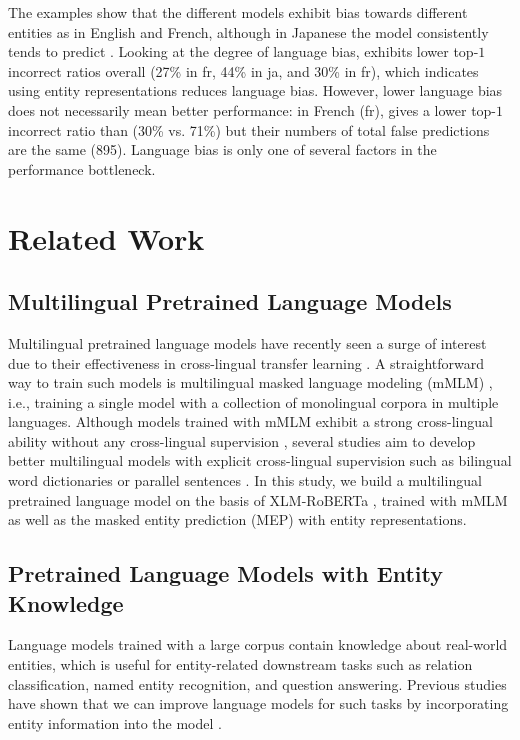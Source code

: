 \documentclass[11pt]{article}
\begin{document}
The examples show that the different models exhibit bias towards different entities as in English and French, although in Japanese the model consistently tends to predict .
Looking at the degree of language bias, \mlukeEwithXY{} exhibits lower top-$1$ incorrect ratios overall (27\% in fr, 44\% in ja, and 30\% in fr), which indicates using entity representations reduces language bias.
However, lower language bias does not necessarily mean better performance: in French (fr), \mlukeEwithXY{} gives
a lower top-$1$ incorrect ratio than \mbert{} (30\% vs. 71\%) but their numbers of total false predictions are the same (895).
Language bias is only one of several factors in the performance bottleneck.
  \section{Related Work}

\subsection{Multilingual Pretrained Language Models}
Multilingual pretrained language models have recently seen a surge of interest due to their effectiveness in cross-lingual transfer learning \citep{NEURIPS2019_c04c19c2,liu-etal-2020-multilingual}.
A straightforward way to train such models is multilingual masked language modeling (mMLM) \citep{devlin2018bert,conneau-etal-2020-unsupervised}, i.e., training a single model with a collection of monolingual corpora in multiple languages.
Although models trained with mMLM exhibit a strong cross-lingual ability without any cross-lingual supervision \citep{K-mBERT-ICLR-2020,conneau-etal-2020-emerging}, several studies aim to develop better multilingual models with explicit cross-lingual supervision such as bilingual word dictionaries \citep{conneau-etal-2020-emerging} or parallel sentences \citep{NEURIPS2019_c04c19c2}.
In this study, we build a multilingual pretrained language model on the basis of XLM-RoBERTa \citep{conneau-etal-2020-unsupervised}, trained with mMLM as well as the masked entity prediction (MEP) \citep{yamada-etal-2020-luke} with entity representations.

\subsection{Pretrained Language Models with Entity Knowledge}
Language models trained with a large corpus contain knowledge about real-world entities, which is useful for entity-related downstream tasks such as relation classification, named entity recognition, and question answering.
Previous studies have shown that we can improve language models for such tasks by incorporating entity information into the model \citep{Zhang2019,peters-knowbert,wang2019kepler,Xiong2020Pretrained,fevry-etal-2020-entities,yamada-etal-2020-luke}.
\end{document}
